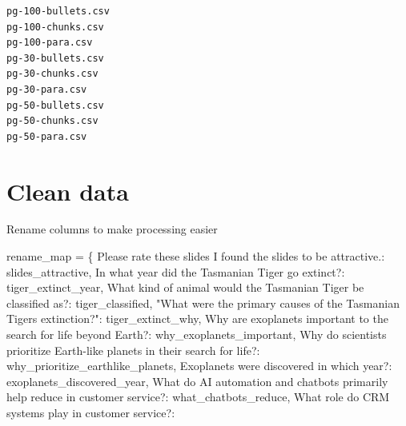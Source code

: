 \documentclass[
  letterpaper,
  DIV=11,
  numbers=noendperiod]{scrartcl}
\newenvironment{Shaded}{\begin{snugshade}}{\end{snugshade}}
\newcommand{\NormalTok}[1]{\textcolor[rgb]{0.00,0.23,0.31}{#1}}
\newcommand{\OperatorTok}[1]{\textcolor[rgb]{0.37,0.37,0.37}{#1}}
\newcommand{\StringTok}[1]{\textcolor[rgb]{0.13,0.47,0.30}{#1}}
\begin{document}
\begin{verbatim}
pg-100-bullets.csv
pg-100-chunks.csv
pg-100-para.csv
pg-30-bullets.csv
pg-30-chunks.csv
pg-30-para.csv
pg-50-bullets.csv
pg-50-chunks.csv
pg-50-para.csv
\end{verbatim}

\section{Clean data}\label{clean-data}

Rename columns to make processing easier

\begin{Shaded}
\begin{Highlighting}[]
\NormalTok{rename\_map }\OperatorTok{=}\NormalTok{ \{}
    \StringTok{\textquotesingle{}Please rate these slides I found the slides to be attractive.\textquotesingle{}}\NormalTok{: }
      \StringTok{\textquotesingle{}slides\_attractive\textquotesingle{}}\NormalTok{,}
    \StringTok{\textquotesingle{}In what year did the Tasmanian Tiger go extinct?\textquotesingle{}}\NormalTok{: }
      \StringTok{\textquotesingle{}tiger\_extinct\_year\textquotesingle{}}\NormalTok{,}
    \StringTok{\textquotesingle{}What kind of animal would the Tasmanian Tiger be classified as?\textquotesingle{}}\NormalTok{: }
      \StringTok{\textquotesingle{}tiger\_classified\textquotesingle{}}\NormalTok{,}
    \StringTok{"What were the primary causes of the Tasmanian Tiger\textquotesingle{}s extinction?"}\NormalTok{: }
      \StringTok{\textquotesingle{}tiger\_extinct\_why\textquotesingle{}}\NormalTok{,}
    \StringTok{\textquotesingle{}Why are exoplanets important to the search for life beyond Earth?\textquotesingle{}}\NormalTok{: }
      \StringTok{\textquotesingle{}why\_exoplanets\_important\textquotesingle{}}\NormalTok{,}
    \StringTok{\textquotesingle{}Why do scientists prioritize Earth{-}like planets in their search for life?\textquotesingle{}}\NormalTok{: }
      \StringTok{\textquotesingle{}why\_prioritize\_earthlike\_planets\textquotesingle{}}\NormalTok{,}
    \StringTok{\textquotesingle{}Exoplanets were discovered in which year?\textquotesingle{}}\NormalTok{: }
      \StringTok{\textquotesingle{}exoplanets\_discovered\_year\textquotesingle{}}\NormalTok{,}
    \StringTok{\textquotesingle{}What do AI automation and chatbots primarily help reduce in customer service?\textquotesingle{}}\NormalTok{: }
      \StringTok{\textquotesingle{}what\_chatbots\_reduce\textquotesingle{}}\NormalTok{,}
    \StringTok{\textquotesingle{}What role do CRM systems play in customer service?\textquotesingle{}}\NormalTok{: }

\end{Highlighting}
\end{Shaded}
\end{document}
